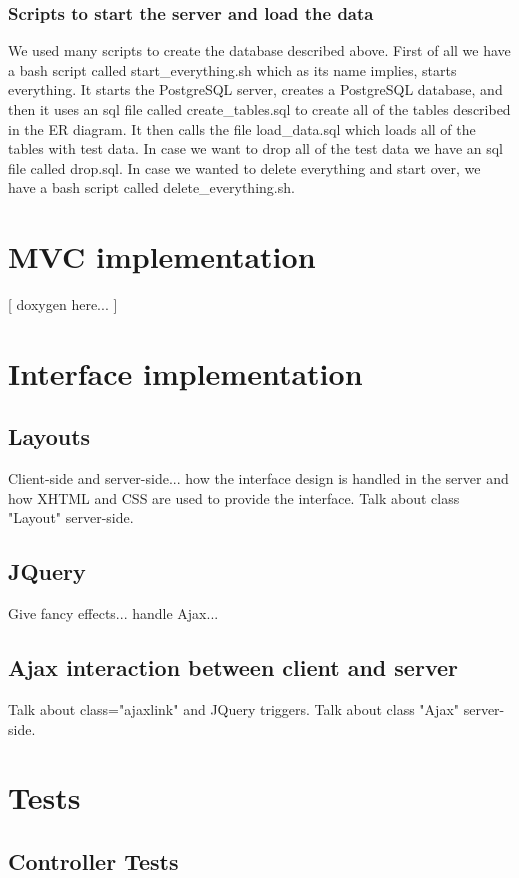 \documentclass[12pt]{report}
\begin{document}
\subsubsection{Scripts to start the server and load the data}
We used many scripts to create the database described above.  First of all we have a bash script called start\_everything.sh which as its name implies, starts everything.  It starts the PostgreSQL server, creates a PostgreSQL database, and then it uses an sql file called create\_tables.sql to create all of the tables described in the ER diagram.  It then calls the file load\_data.sql which loads all of the tables with test data.  In case we want to drop all of the test data we have an sql file called drop.sql.  In case we wanted to delete everything and start over, we have a bash script called delete\_everything.sh. 

\section{MVC implementation}
[ doxygen here... ]

\section{Interface implementation}
\subsection{Layouts}
Client-side and server-side... how the interface design is handled in the server and how XHTML and CSS are used to provide the interface. Talk about class "Layout" server-side.
\subsection{JQuery}
Give fancy effects... handle Ajax... 
\subsection{Ajax interaction between client and server}
Talk about class="ajaxlink" and JQuery triggers. Talk about class "Ajax" server-side.

\section{Tests}

\subsection{Controller Tests}
\end{document}
